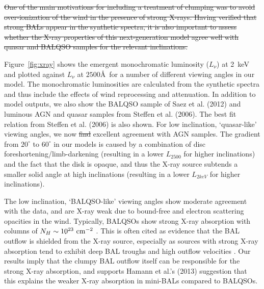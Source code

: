 \documentclass[preprint, a4paper, 11pt]{aastex}
\providecommand{\DIFadd}[1]{{\protect\color{blue}\uwave{#1}}} %
\providecommand{\DIFdel}[1]{{\protect\color{red}\sout{#1}}}                      %
\providecommand{\DIFaddbegin}{} %
\providecommand{\DIFaddend}{} %
\providecommand{\DIFdelbegin}{} %
\providecommand{\DIFdelend}{} %
\begin{document}
\DIFdel{One of the main motivations for including a treatment of clumping was
to avoid over-ionization of the wind in the presence of strong X-rays. 
Having verified that strong BALs appear in the synthetic spectra,
it is also important to assess whether the X-ray properties of this
next-generation model agree well with quasar and BALQSO samples for the relevant
inclinations.
}%

\DIFdelend Figure~\ref{fig:xray} shows the emergent
monochromatic luminosity ($L_\nu$) at 2~keV and 
plotted against $L_\nu$ at $2500$\AA\ for a number of different viewing angles in our model.
The monochromatic luminosities are calculated from the synthetic spectra and thus include
the effects of wind reprocessing and attenuation. In addition to model outputs,
we also show the BALQSO sample of Saez et al. (2012) and luminous AGN and quasar
samples from Steffen et al. (2006). The best fit relation from Steffen et al. (2006) 
is also shown. For low inclination, `quasar-like' viewing angles,
we now \DIFdelbegin \DIFdel{find }\DIFdelend \DIFaddbegin \DIFadd{show }\DIFaddend excellent agreement with AGN samples. The gradient from $20^\circ$ to
$60^\circ$ in our models is caused by a combination of disc foreshortening/limb-darkening 
(resulting in a lower $L_{2500}$ for higher inclinations) and the fact that the disk 
is opaque, and thus the X-ray source subtends a smaller solid angle at high inclinations
(resulting in a lower $L_{2keV}$ for higher inclinations). 



The low inclination, `BALQSO-like' viewing angles show moderate agreement with the data,
and are X-ray weak due to bound-free and electron scattering opacities in the wind.
Typically, BALQSOs show strong X-ray absorption with columns 
of $N_H\sim10^{23}~\rm{cm^{-2}}$ 
\citep{green1996,mathur2000,green2001,grupemathur2003}.
This is often cited as evidence that the BAL outflow is shielded from
the X-ray source, especially as sources with strong X-ray absorption tend
to exhibit deep BAL troughs and high outflow velocities 
\citep{brandt2000,laorbrandt2002,gallagher2006}.
Our results imply that the clumpy BAL outflow
itself can be responsible for the strong X-ray absorption, 
and supports Hamann et al.'s (2013) suggestion that 
this explains the weaker X-ray absorption in mini-BALs 
compared to BALQSOs.
\end{document}
